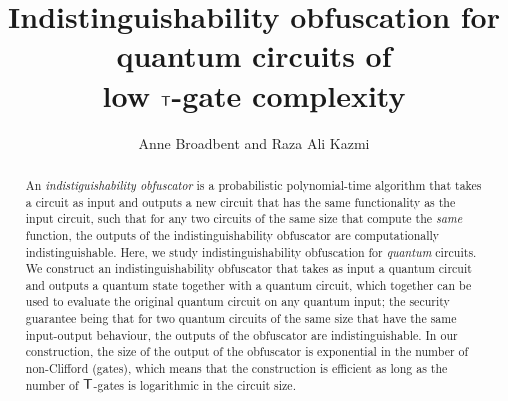 \documentclass[english,11pt]{article}
\title{Indistinguishability obfuscation for \\quantum circuits of \\  low ${\sf T}$-gate complexity}
\author{Anne Broadbent and Raza Ali Kazmi}
\affil{University of Ottawa, Department of Mathematics and Statistics,\\\texttt{\{abroadbe,rkazmi\}@uottawa.ca.}}
\date{} %
\begin{document}
\maketitle

\begin{abstract}
An \emph{indistiguishability obfuscator} is a probabilistic polynomial-time algorithm that takes a circuit as input
and outputs a new circuit  that has the same functionality as the input circuit, such that  for any two circuits of the same size that compute the \emph{same} function, the outputs of the indistinguishability obfuscator are computationally indistinguishable. Here, we study indistinguishability obfuscation for \emph{quantum} circuits. We construct an indistinguishability  obfuscator that takes as input a quantum circuit and outputs a quantum state together with a quantum circuit, which together can be used to evaluate the original quantum circuit on any quantum input; the security guarantee being that for two quantum circuits of the same size that have the same input-output behaviour, the outputs of the obfuscator are indistinguishable. In our construction, the size of the output of the obfuscator is exponential in the number of non-Clifford (\tgate gates), which means that the construction is efficient as long as the number of ${\sf T}$-gates  is logarithmic in the circuit size.
\end{abstract}

\newpage

\setcounter{tocdepth}{2}
\tableofcontents
\clearpage
{}
\setcounter{page}{1}







%


\end{document}
